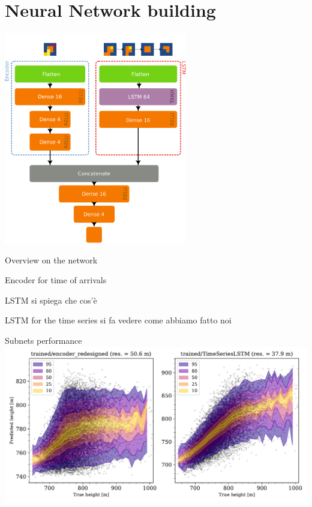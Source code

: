 \documentclass{beamer}
\begin{document}
\section{Neural Network building}

    \centering
    \includegraphics[width=0.6\textwidth]{model.pdf}
\begin{frame}{Overview on the network}

    
\end{frame}

\begin{frame}{Encoder for time of arrivals}

    
\end{frame}


\begin{frame}{LSTM}
si spiega che cos'è
    
\end{frame}

\begin{frame}{LSTM for the time series}
si fa vedere come abbiamo fatto noi
    
\end{frame}

\begin{frame}{Subnets performance}
    \includegraphics[width=\textwidth]{sub_net_train.pdf}
\end{frame}
\end{document}
